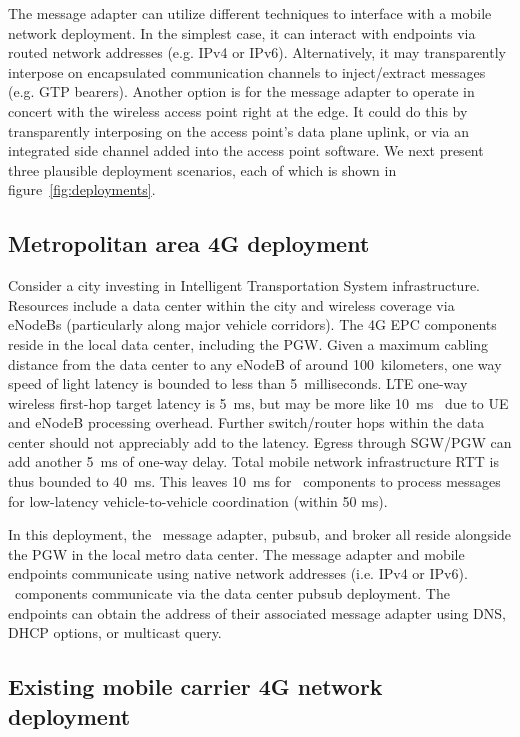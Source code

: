 The message adapter can utilize different techniques to interface with
a mobile network deployment. In the simplest case, it can interact
with endpoints via routed network addresses (e.g. IPv4 or
IPv6). Alternatively, it may transparently interpose on encapsulated
communication channels to inject/extract messages (e.g. GTP
bearers). Another option is for the message adapter to operate in
concert with the wireless access point right at the edge. It could do
this by transparently interposing on the access point's data plane
uplink, or via an integrated side channel added into the access point
software.  We next present three plausible deployment scenarios, each
of which is shown in figure~\ref{fig:deployments}.

\subsection{Metropolitan area 4G deployment}
\label{sec:metro-deploy}

Consider a city investing in Intelligent Transportation System
infrastructure. Resources include a data center within the city and
wireless coverage via eNodeBs (particularly along major vehicle
corridors). The 4G EPC components reside in the local data center,
including the PGW.  Given a maximum cabling distance from the data
center to any eNodeB of around 100~kilometers, one way speed of light
latency is bounded to less than 5~milliseconds.  LTE one-way wireless
first-hop target latency is 5~ms, but may be more like
10~ms~\cite{laner2012comparison} due to UE and eNodeB processing overhead.
Further switch/router hops within the data center should not
appreciably add to the latency. Egress through SGW/PGW can add another
5~ms of one-way delay.  Total mobile network
infrastructure RTT is thus bounded to 40~ms. This leaves 10~ms for
\name~components to process messages for low-latency
vehicle-to-vehicle coordination (within 50 ms).

In this deployment, the \name~message adapter, pubsub, and broker
all reside alongside the PGW in the local metro data center. The
message adapter and mobile endpoints communicate using native network
addresses (i.e. IPv4 or IPv6).  \name~components communicate via the
data center pubsub deployment. The endpoints can obtain the address
of their associated message adapter using DNS, DHCP options, or
multicast query.

\subsection{Existing mobile carrier 4G network deployment}

